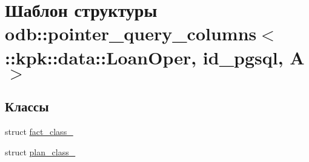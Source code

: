 \hypertarget{structodb_1_1pointer__query__columns_3_01_1_1kpk_1_1data_1_1_loan_oper_00_01id__pgsql_00_01_a_01_4}{}\section{Шаблон структуры odb\+:\+:pointer\+\_\+query\+\_\+columns$<$ \+:\+:kpk\+:\+:data\+:\+:Loan\+Oper, id\+\_\+pgsql, A $>$}
\label{structodb_1_1pointer__query__columns_3_01_1_1kpk_1_1data_1_1_loan_oper_00_01id__pgsql_00_01_a_01_4}
\subsection*{Классы}
\begin{DoxyCompactItemize}
\item 
struct \hyperlink{structodb_1_1pointer__query__columns_3_01_1_1kpk_1_1data_1_1_loan_oper_00_01id__pgsql_00_01_a_01_4_1_1fact__class__}{fact\+\_\+class\+\_\+}
\item 
struct \hyperlink{structodb_1_1pointer__query__columns_3_01_1_1kpk_1_1data_1_1_loan_oper_00_01id__pgsql_00_01_a_01_4_1_1plan__class__}{plan\+\_\+class\+\_\+}
\end{DoxyCompactItemize}
